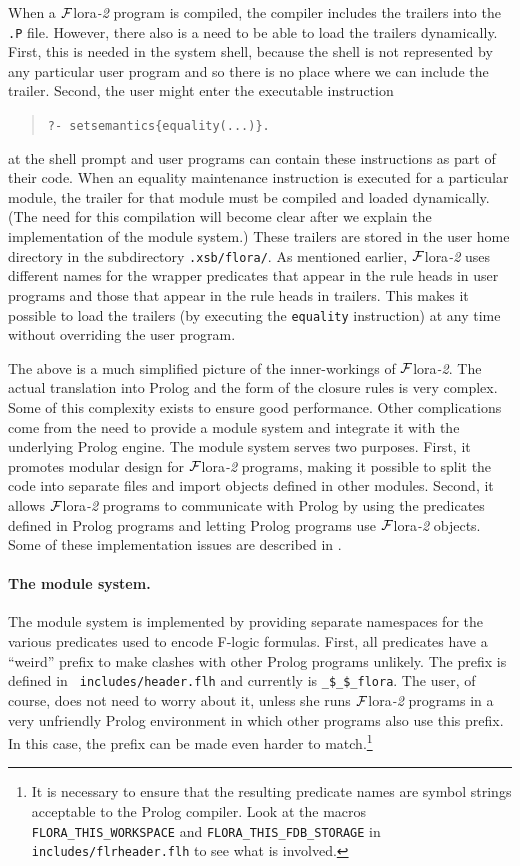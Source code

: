 \documentclass[11pt]{article}
\newcommand{\FLSYSTEM}{{\mbox{\sc ${\cal F}${lora}\rm\emph{-2}}}\xspace}
\newcommand{\fl}{\mbox{F-logic}\xspace}
\begin{document}
When a \FLSYSTEM program is compiled, the compiler includes the trailers into
the {\tt .P} file. However, there also is a need to be able to load the
trailers dynamically. First, this is needed in the system shell, because
the shell is not represented by any particular user program and so there is
no place where we can include the trailer. Second, the user might enter the
executable instruction 
\begin{quote}
   {\tt ?- setsemantics\{equality(...)\}. }
\end{quote}
at the shell prompt and user programs can contain these instructions as
part of their code.  When an equality maintenance instruction is executed
for a particular module, the trailer for that module must be compiled and
loaded dynamically.  (The need for this compilation will become clear after
we explain the implementation of the module system.)  These trailers are
stored in the user home directory in the subdirectory {\tt .xsb/flora/}.
As mentioned earlier, \FLSYSTEM uses different names for the wrapper predicates
that appear in the rule heads in user programs and those that appear in the
rule heads in trailers. This makes it possible to load the trailers (by
executing the {\tt equality} instruction) at any time without overriding
the user program.

The above is a much simplified picture of the inner-workings of \FLSYSTEM. The
actual translation into Prolog and the form of the closure rules is very
complex.  Some of this complexity exists to ensure good performance.  Other
complications come from the need to provide a module system and integrate
it with the underlying Prolog engine.  The module system serves two
purposes.  First, it promotes modular design for \FLSYSTEM programs, making it
possible to split the code into separate files and import objects defined
in other modules. Second, it allows \FLSYSTEM programs to communicate with
Prolog by using the predicates defined in Prolog programs and letting
Prolog programs use \FLSYSTEM objects.  Some of these implementation issues
are described in \cite{guiz-flora-00}.

\paragraph{The module system.} The module system is implemented by
providing separate namespaces for the various predicates used to encode \fl
formulas. First, all predicates have a ``weird'' prefix to make clashes with
other Prolog programs unlikely. The prefix is defined in {\tt
  includes/header.flh} and currently is {\tt \_\$\_\$\_flora}. The user, of
course, does not need to worry about it, unless she runs \FLSYSTEM programs in
a very unfriendly Prolog environment in which other programs also use this
prefix. In this case, the prefix can be made
even harder to match.\footnote{
  It is necessary to ensure that the resulting predicate names are symbol
  strings acceptable to the Prolog compiler. Look at the macros
  {\tt FLORA\_THIS\_WORKSPACE} and {\tt FLORA\_THIS\_FDB\_STORAGE} in
  {\tt includes/flrheader.flh} to see what is involved.
  }
\end{document}
